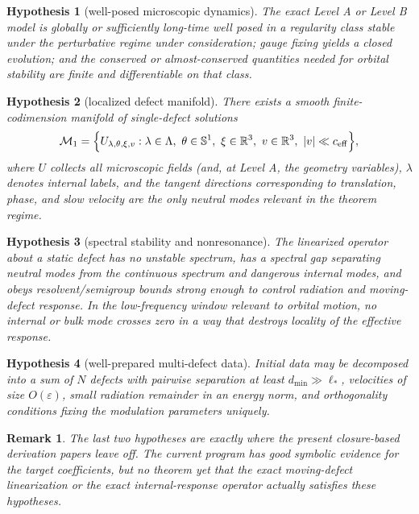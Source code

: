 \documentclass[11pt]{article}
\newcommand{\R}{\mathbb R}
\newcommand{\eps}{\varepsilon}
\newtheorem{remark}{Remark}
\newtheorem{hypothesis}{Hypothesis}
\begin{document}
\begin{hypothesis}[well-posed microscopic dynamics]
The exact Level A or Level B model is globally or sufficiently long-time well posed in a regularity class stable under the perturbative regime under consideration; gauge fixing yields a closed evolution; and the conserved or almost-conserved quantities needed for orbital stability are finite and differentiable on that class.
\end{hypothesis}

\begin{hypothesis}[localized defect manifold]
There exists a smooth finite-codimension manifold of single-defect solutions
\begin{equation}
  \mathcal M_{1}=\Big\{ U_{\lambda,\theta,\xi,v} :
  \lambda\in\Lambda,\ \theta\in\mathbb S^{1},\ \xi\in\R^{3},\ v\in\R^{3},\ |v|\ll c_{\rm eff}\Big\},
\end{equation}
where $U$ collects all microscopic fields (and, at Level A, the geometry variables), $\lambda$ denotes internal labels, and the tangent directions corresponding to translation, phase, and slow velocity are the only neutral modes relevant in the theorem regime.
\end{hypothesis}

\begin{hypothesis}[spectral stability and nonresonance]
The linearized operator about a static defect has no unstable spectrum, has a spectral gap separating neutral modes from the continuous spectrum and dangerous internal modes, and obeys resolvent/semigroup bounds strong enough to control radiation and moving-defect response. In the low-frequency window relevant to orbital motion, no internal or bulk mode crosses zero in a way that destroys locality of the effective response.
\end{hypothesis}

\begin{hypothesis}[well-prepared multi-defect data]
Initial data may be decomposed into a sum of $N$ defects with pairwise separation at least $d_{\min}\gg \ell_{\ast}$, velocities of size $O(\eps)$, small radiation remainder in an energy norm, and orthogonality conditions fixing the modulation parameters uniquely.
\end{hypothesis}

\begin{remark}
The last two hypotheses are exactly where the present closure-based derivation papers leave off. The current program has good symbolic evidence for the target coefficients, but no theorem yet that the exact moving-defect linearization or the exact internal-response operator actually satisfies these hypotheses.
\end{remark}
\end{document}
